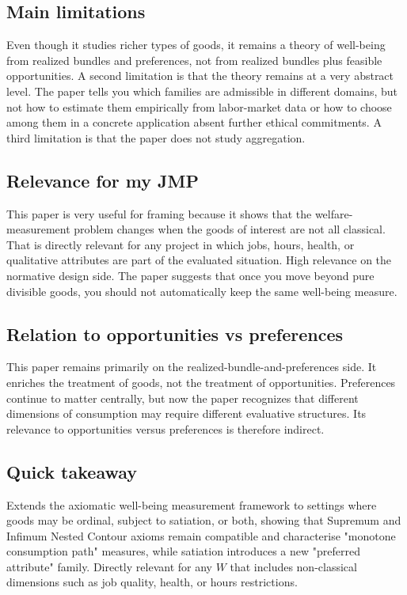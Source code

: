 \documentclass[11pt,a4paper]{article}
\begin{document}
\subsection*{Main limitations}
Even though it studies richer types of goods, it remains a theory of well-being from realized bundles and preferences, not from realized bundles plus feasible opportunities. A second limitation is that the theory remains at a very abstract level. The paper tells you which families are admissible in different domains, but not how to estimate them empirically from labor-market data or how to choose among them in a concrete application absent further ethical commitments. A third limitation is that the paper does not study aggregation.

\subsection*{Relevance for my JMP}
This paper is very useful for framing because it shows that the welfare-measurement problem changes when the goods of interest are not all classical. That is directly relevant for any project in which jobs, hours, health, or qualitative attributes are part of the evaluated situation. High relevance on the normative design side. The paper suggests that once you move beyond pure divisible goods, you should not automatically keep the same well-being measure.

\subsection*{Relation to opportunities vs preferences}
This paper remains primarily on the realized-bundle-and-preferences side. It enriches the treatment of goods, not the treatment of opportunities. Preferences continue to matter centrally, but now the paper recognizes that different dimensions of consumption may require different evaluative structures. Its relevance to opportunities versus preferences is therefore indirect.

\subsection*{Quick takeaway}
Extends the axiomatic well-being measurement framework to settings where goods may be ordinal, subject to satiation, or both, showing that Supremum and Infimum Nested Contour axioms remain compatible and characterise "monotone consumption path" measures, while satiation introduces a new "preferred attribute" family. Directly relevant for any $W$ that includes non-classical dimensions such as job quality, health, or hours restrictions.
\end{document}
